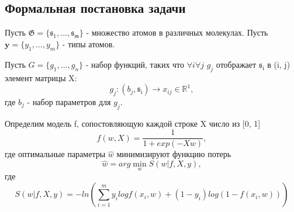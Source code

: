 \documentclass[12pt,twoside]{article}
\begin{document}
\subsection{Формальная постановка задачи}
	Пусть  $\mathfrak{G} = \{\mathfrak{s_1},...,\mathfrak{s_m}\}$ - множество атомов в различных молекулах. Пусть $\textbf{y} = \{y_1,...,y_m\}$ - типы атомов.

	Пусть $G = \{g_1,...,g_n\}$ - набор функций, таких что $\forall i \forall j$ $g_j$ отображает $\mathfrak{s_i}$ в (i, j) элемент матрицы X: $$g_j: (b_j, \mathfrak{s_i})\rightarrow x_{ij} \in \mathbb{R}^1,$$ где $b_j$ - набор параметров для $g_j$.
	
	Определим модель f, сопостовляющую каждой строке X число из [0, 1] $$f(w, X) = \frac{1}{1+exp(-Xw)},$$ где оптимальные параметры $\hat{w}$ минимизируют функцию потерь $$\hat{w}=arg\min\limits_{w} S(w|f, X, y),$$ где $$S(w|f, X, y)=-ln(\sum_{i=1}^m {y_i logf(x_i, w) + (1-y_i)log(1-f(x_i, w))})$$
\end{document}
